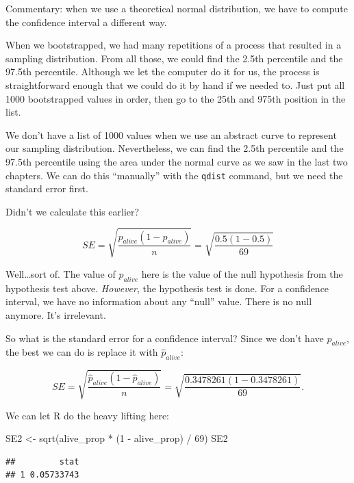 \documentclass[
]{book}
\newenvironment{Shaded}{\begin{snugshade}}{\end{snugshade}}
\newcommand{\DecValTok}[1]{\textcolor[rgb]{0.00,0.00,0.81}{#1}}
\newcommand{\FunctionTok}[1]{\textcolor[rgb]{0.00,0.00,0.00}{#1}}
\newcommand{\NormalTok}[1]{#1}
\newcommand{\OtherTok}[1]{\textcolor[rgb]{0.56,0.35,0.01}{#1}}
\newcommand{\SpecialCharTok}[1]{\textcolor[rgb]{0.00,0.00,0.00}{#1}}
\begin{document}
Commentary: when we use a theoretical normal distribution, we have to compute the confidence interval a different way.

When we bootstrapped, we had many repetitions of a process that resulted in a sampling distribution. From all those, we could find the 2.5th percentile and the 97.5th percentile. Although we let the computer do it for us, the process is straightforward enough that we could do it by hand if we needed to. Just put all 1000 bootstrapped values in order, then go to the 25th and 975th position in the list.

We don't have a list of 1000 values when we use an abstract curve to represent our sampling distribution. Nevertheless, we can find the 2.5th percentile and the 97.5th percentile using the area under the normal curve as we saw in the last two chapters. We can do this ``manually'' with the \texttt{qdist} command, but we need the standard error first.

Didn't we calculate this earlier?

\[
SE = \sqrt{\frac{p_{alive}(1 - p_{alive})}{n}} = \sqrt{\frac{0.5(1 - 0.5)}{69}}
\]

Well\ldots sort of. The value of \(p_{alive}\) here is the value of the null hypothesis from the hypothesis test above. \emph{However}, the hypothesis test is done. For a confidence interval, we have no information about any ``null'' value. There is no null anymore. It's irrelevant.

So what is the standard error for a confidence interval? Since we don't have \(p_{alive}\), the best we can do is replace it with \(\hat{p}_{alive}\):

\[
SE = \sqrt{\frac{\hat{p}_{alive} (1 - \hat{p}_{alive})}{n}} = \sqrt{\frac{0.3478261 (1 - 0.3478261 )}{69}}.
\]

We can let R do the heavy lifting here:

\begin{Shaded}
\begin{Highlighting}[]
\NormalTok{SE2 }\OtherTok{\textless{}{-}} \FunctionTok{sqrt}\NormalTok{(alive\_prop }\SpecialCharTok{*}\NormalTok{ (}\DecValTok{1} \SpecialCharTok{{-}}\NormalTok{ alive\_prop) }\SpecialCharTok{/} \DecValTok{69}\NormalTok{)}
\NormalTok{SE2}
\end{Highlighting}
\end{Shaded}

\begin{verbatim}
##         stat
## 1 0.05733743
\end{verbatim}
\end{document}
